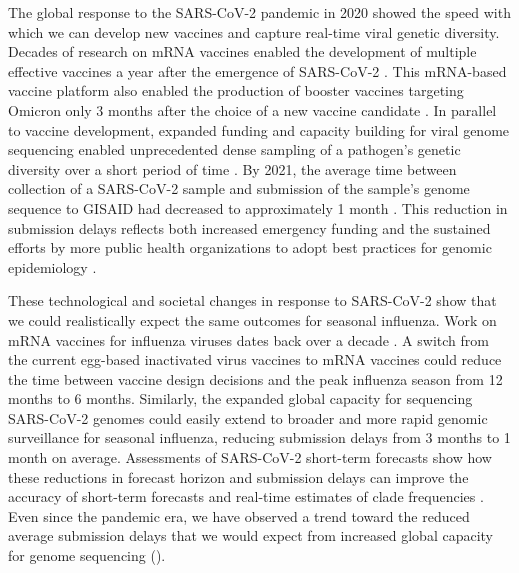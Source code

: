 \documentclass[9pt,lineno]{elife}
\begin{document}
The global response to the SARS-CoV-2 pandemic in 2020 showed the speed with which we can develop new vaccines and capture real-time viral genetic diversity.
Decades of research on mRNA vaccines enabled the development of multiple effective vaccines a year after the emergence of SARS-CoV-2 \citep{Mulligan2020,Baden2021}.
This mRNA-based vaccine platform also enabled the production of booster vaccines targeting Omicron only 3 months after the choice of a new vaccine candidate \citep{Grant2023}.
In parallel to vaccine development, expanded funding and capacity building for viral genome sequencing enabled unprecedented dense sampling of a pathogen's genetic diversity over a short period of time \citep{Chen2022}.
By 2021, the average time between collection of a SARS-CoV-2 sample and submission of the sample's genome sequence to GISAID had decreased to approximately 1 month \citep{Brito2022}.
This reduction in submission delays reflects both increased emergency funding and the sustained efforts by more public health organizations to adopt best practices for genomic epidemiology \citep{Kalia2021,Black2020}.

These technological and societal changes in response to SARS-CoV-2 show that we could realistically expect the same outcomes for seasonal influenza.
Work on mRNA vaccines for influenza viruses dates back over a decade \citep{Petsch2012,Brazzoli2016,Pardi2018,Feldman2019}.
A switch from the current egg-based inactivated virus vaccines to mRNA vaccines could reduce the time between vaccine design decisions and the peak influenza season from 12 months to 6 months.
Similarly, the expanded global capacity for sequencing SARS-CoV-2 genomes could easily extend to broader and more rapid genomic surveillance for seasonal influenza, reducing submission delays from 3 months to 1 month on average.
Assessments of SARS-CoV-2 short-term forecasts show how these reductions in forecast horizon and submission delays can improve the accuracy of short-term forecasts and real-time estimates of clade frequencies \citep{Abousamra2023}.
Even since the pandemic era, we have observed a trend toward the reduced average submission delays that we would expect from increased global capacity for genome sequencing ().
\end{document}
